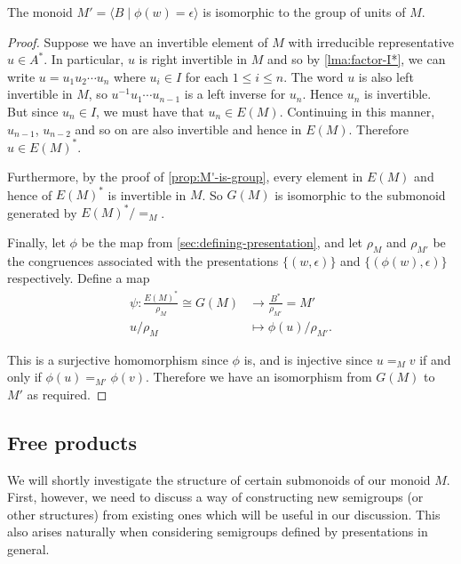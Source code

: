 \documentclass[noindex,noinsetproof,12pt]{lmaths}
\begin{document}
\begin{theorem}
	The monoid $M' = \langle B \mid \phi(w) = \epsilon \rangle$ is isomorphic to the group of units of $M$.
\end{theorem}
\begin{proof}
	Suppose we have an invertible element of $M$ with irreducible representative $u \in A^*$. In particular, $u$ is right invertible in $M$ and so by \cref{lma:factor-I*}, we can write $u = u_1u_2\cdots u_n$ where $u_i \in I$ for each $1 \le i \le n$. The word $u$ is also left invertible in $M$, so $u^{-1}u_1\cdots u_{n-1}$ is a left inverse for $u_n$.
	Hence $u_n$ is invertible. But since $u_n \in I$, we must have that $u_n \in E(M)$. Continuing in this manner, $u_{n-1}$, $u_{n-2}$ and so on are also invertible and hence in $E(M)$. Therefore $u \in E(M)^*$.

	Furthermore, by the proof of \cref{prop:M'-is-group}, every element in $E(M)$ and hence of $E(M)^*$ is invertible in $M$. So $G(M)$ is isomorphic to the submonoid generated by $E(M)^*/{=_M}$.

	Finally, let $\phi$ be the map from \cref{sec:defining-presentation}, and let $\rho_M$ and $\rho_{M'}$ be the congruences associated with the presentations $\{(w, \epsilon)\}$ and $\{(\phi(w), \epsilon)\}$ respectively. Define a map
	\begin{align*}
		\psi : \frac{E(M)^*}{\rho_M} \cong G(M) &\to \frac{B^*}{\rho_{M'}} = M' \\
		u/\rho_M &\mapsto \phi(u)/\rho_{M'}.
	\end{align*}

	This is a surjective homomorphism since $\phi$ is, and is injective since $u =_M v$ if and only if $\phi(u) =_{M'} \phi(v)$. Therefore we have an isomorphism from $G(M)$ to $M'$ as required.
\end{proof}


\subsection{Free products}

We will shortly investigate the structure of certain submonoids of our monoid $M$. First, however, we need to discuss a way of constructing new semigroups (or other structures) from existing ones which will be useful in our discussion. This  also arises naturally when considering semigroups defined by presentations in general.
\end{document}

